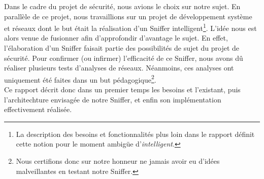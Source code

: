 Dans le cadre du projet de sécurité, nous avions le choix sur notre sujet. En parallèle de ce projet, nous travaillions sur un projet de développement système et réseaux dont le but était la réalisation d'un Sniffer intelligent\footnote{La description des besoins et fonctionnalités plus loin dans le rapport définit cette notion pour le moment ambigüe d'\emph{intelligent}.}. L'idée nous est alors venue de fusionner afin d'approfondir d'avantage le sujet. En effet, l'élaboration d'un Sniffer faisait partie des possibilités de sujet du projet de sécurité. Pour confirmer (ou infirmer) l'efficacité de ce Sniffer, nous avons dû réaliser plusieurs tests d'analyses de réseaux. Néanmoins, ces analyses ont uniquement été faites dans un but pédagogique\footnote{Nous certifions donc sur notre honneur ne jamais avoir eu d'idées malveillantes en testant notre Sniffer.}.\\

 Ce rapport décrit donc dans un premier temps les besoins et l'existant, puis l'architechture envisagée de notre Sniffer, et enfin son implémentation effectivement réalisée.
